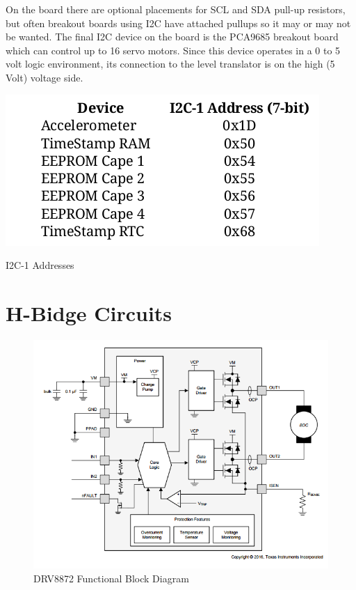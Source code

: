 \documentclass[12pt,oneside,final]{siuethesis}
\theoremstyle{definition}
\begin{document}
On the board there are optional placements for SCL and SDA pull-up resistors, but often breakout boards using I2C have attached pullups so it may or may not be wanted. The final I2C device on the board is the PCA9685 breakout board which can control up to 16 servo motors. Since this device operates in a 0 to 5 volt logic environment, its connection to the level translator is on the high (5 Volt) voltage side.

\begin{table}[htbp!]
 \centering
 \includegraphics[scale=.5,keepaspectratio=true]{./images/I2C_addr.png}
 \caption{I2C-1 Addresses}
 \label{tab:I2C-1 List}
\end{table}

\section{H-Bidge Circuits}

\begin{figure}[htbp!]
 \centering
 \includegraphics[scale=.85,keepaspectratio=true]{./images/DRV8872_block.PNG}
 \caption{DRV8872 Functional Block Diagram}
 \label{fig:DRV8872}
\end{figure}
\end{document}
